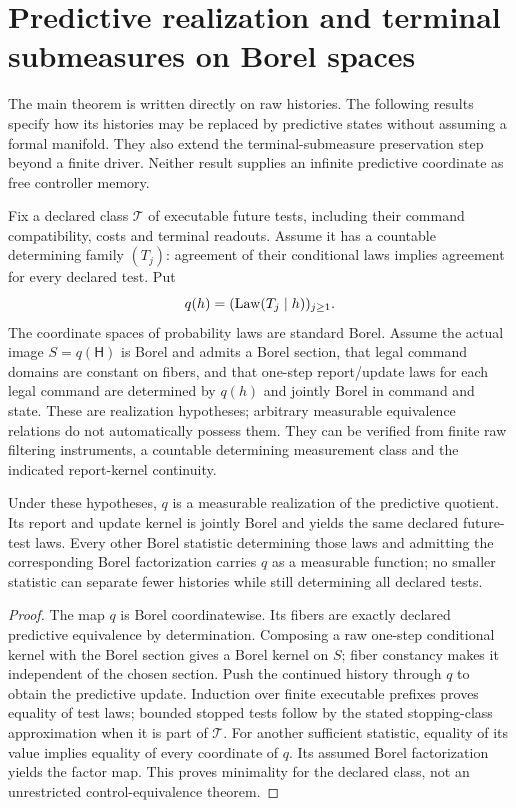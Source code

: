 \section{Predictive realization and terminal submeasures on Borel spaces}
\label{sec:flow}
The main theorem is written directly on raw histories. The following results specify how its histories may be replaced by predictive states without assuming a formal manifold. They also extend the terminal-submeasure preservation step beyond a finite driver. Neither result supplies an infinite predictive coordinate as free controller memory.

Fix a declared class $\mathcal T$ of executable future tests, including their command compatibility, costs and terminal readouts. Assume it has a countable determining family $(T_j)$: agreement of their conditional laws implies agreement for every declared test. Put
\[
 q(h)=(\operatorname{Law}(T_j\mid h))_{j\ge1}.
\]
The coordinate spaces of probability laws are standard Borel. Assume the actual image $S=q(\mathsf H)$ is Borel and admits a Borel section, that legal command domains are constant on fibers, and that one-step report/update laws for each legal command are determined by $q(h)$ and jointly Borel in command and state. These are realization hypotheses; arbitrary measurable equivalence relations do not automatically possess them. They can be verified from finite raw filtering instruments, a countable determining measurement class and the indicated report-kernel continuity.

\begin{proposition}\label{prop:quotient}
Under these hypotheses, $q$ is a measurable realization of the predictive quotient. Its report and update kernel is jointly Borel and yields the same declared future-test laws. Every other Borel statistic determining those laws and admitting the corresponding Borel factorization carries $q$ as a measurable function; no smaller statistic can separate fewer histories while still determining all declared tests.
\end{proposition}
\begin{proof}
The map $q$ is Borel coordinatewise. Its fibers are exactly declared predictive equivalence by determination. Composing a raw one-step conditional kernel with the Borel section gives a Borel kernel on $S$; fiber constancy makes it independent of the chosen section. Push the continued history through $q$ to obtain the predictive update. Induction over finite executable prefixes proves equality of test laws; bounded stopped tests follow by the stated stopping-class approximation when it is part of $\mathcal T$. For another sufficient statistic, equality of its value implies equality of every coordinate of $q$. Its assumed Borel factorization yields the factor map. This proves minimality for the declared class, not an unrestricted control-equivalence theorem.
\end{proof}

